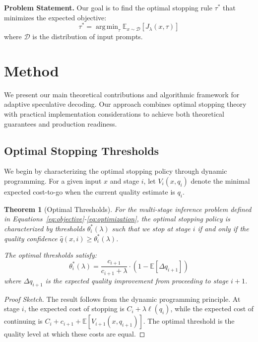 \documentclass{article}
\DeclareMathOperator*{\argmin}{arg\,min}
\theoremstyle{plain}
\newtheorem{theorem}{Theorem}[section]
\theoremstyle{definition}
\theoremstyle{remark}
\begin{document}
\textbf{Problem Statement.} Our goal is to find the optimal stopping rule $\tau^*$ that minimizes the expected objective:
\begin{equation}
\tau^* = \argmin_{\tau} \mathbb{E}_{x \sim \mathcal{D}}[J_\lambda(x, \tau)]
\label{eq:optimization}
\end{equation}
where $\mathcal{D}$ is the distribution of input prompts.

\section{Method}
\label{sec:method}
We present our main theoretical contributions and algorithmic framework for adaptive speculative decoding. Our approach combines optimal stopping theory with practical implementation considerations to achieve both theoretical guarantees and production readiness.

\subsection{Optimal Stopping Thresholds}

We begin by characterizing the optimal stopping policy through dynamic programming. For a given input $x$ and stage $i$, let $V_i(x, q_i)$ denote the minimal expected cost-to-go when the current quality estimate is $q_i$.

\begin{theorem}[Optimal Thresholds]
\label{thm:optimal_thresholds}
For the multi-stage inference problem defined in Equations~\eqref{eq:objective}-\eqref{eq:optimization}, the optimal stopping policy is characterized by thresholds $\theta_i^*(\lambda)$ such that we stop at stage $i$ if and only if the quality confidence $\hat{q}(x, i) \geq \theta_i^*(\lambda)$.

The optimal thresholds satisfy:
\begin{equation}
\theta_i^*(\lambda) = \frac{c_{i+1}}{c_{i+1} + \lambda} \cdot \left(1 - \mathbb{E}[\Delta q_{i+1}]\right)
\label{eq:threshold}
\end{equation}
where $\Delta q_{i+1}$ is the expected quality improvement from proceeding to stage $i+1$.
\end{theorem}

\begin{proof}[Proof Sketch]
The result follows from the dynamic programming principle. At stage $i$, the expected cost of stopping is $C_i + \lambda \ell(q_i)$, while the expected cost of continuing is $C_i + c_{i+1} + \mathbb{E}[V_{i+1}(x, q_{i+1})]$. The optimal threshold is the quality level at which these costs are equal.
\end{proof}
\end{document}
